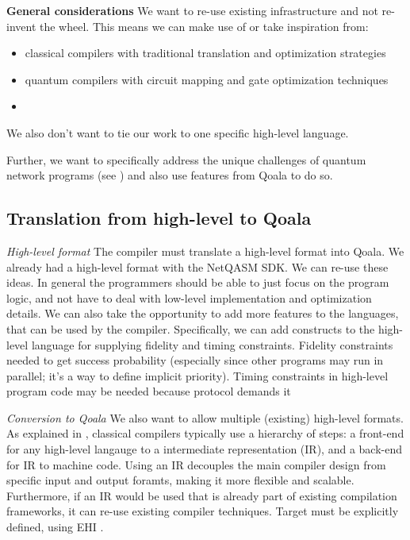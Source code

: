 \textbf{General considerations}
We want to re-use existing infrastructure and not re-invent the wheel. This means we can make use of or take inspiration from:
\begin{itemize}
  \item classical compilers with traditional translation and optimization strategies
  \item quantum compilers with circuit mapping and gate optimization techniques
  \item {}
\end{itemize}

We also don't want to tie our work to one specific high-level language.

Further, we want to specifically address the unique challenges of quantum network programs (see ) and also use features from Qoala to do so.


\subsection{Translation from high-level to Qoala}
\textit{High-level format}
The compiler must translate a high-level format into Qoala.
We already had a high-level format with the NetQASM SDK.
We can re-use these ideas.
In general the programmers should be able to just focus on the program logic, and not have to deal with low-level implementation and optimization details.
We can also take the opportunity to add more features to the languages, that can be used by the compiler.
Specifically, we can add constructs to the high-level language for supplying fidelity and timing constraints.
Fidelity constraints needed to get success probability (especially since other programs may run in parallel; it's a way to define implicit priority).
Timing constraints in high-level program code may be needed because protocol demands it

\textit{Conversion to Qoala}
We also want to allow multiple (existing) high-level formats.
As explained in , classical compilers typically use a hierarchy of steps: a front-end for any high-level langauge to a intermediate representation (IR), and a back-end for IR to machine code.
Using an IR decouples the main compiler design from specific input and output foramts, making it more flexible and scalable.
Furthermore, if an IR would be used that is already part of existing compilation frameworks, it can re-use existing compiler techniques.
Target must be explicitly defined, using EHI .


